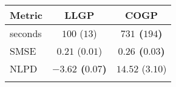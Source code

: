 \begin{tabular}{|l|cc|}\hline\abovespace\belowspace
Metric & LLGP & COGP\\
\hline\abovespace
seconds & $100$ ($13$) & \textbf{$731$ ($194$)}\\
SMSE & $0.21$ ($0.01$) & \textbf{$0.26$ ($0.03$)}\\
NLPD & \textbf{$-3.62$ ($0.07$)} & $14.52$ ($3.10$)\\

\belowspace \\
\hline
\end{tabular}
